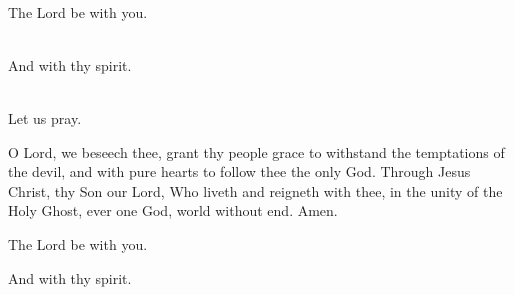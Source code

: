 \newcommand{\dominusvobiscum}{
  \rubric{\Vbar}The Lord be with you.
}
\newcommand{\etcumspiritutuo}{
  \rubric{\Rbar}And with thy spirit.
}

\\
\dominusvobiscum
\\
\etcumspiritutuo
\\
Let us pray.

O Lord, we beseech thee, grant thy people grace to withstand the temptations of the devil, and with pure hearts to follow thee the only God. Through Jesus Christ, thy Son our Lord, Who liveth and reigneth with thee, in the unity of the Holy Ghost, ever one God, world without end.\rubric{\Rbar} Amen.

\dominusvobiscum

\etcumspiritutuo
